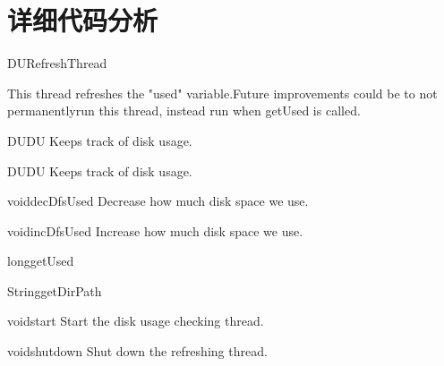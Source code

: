 \chapter{详细代码分析}
\label{ch:src}

\begin{XeClass}{DURefreshThread}

This thread refreshes the "used" variable.Future improvements could be to not permanentlyrun this thread, instead run when getUsed is called.

    \begin{XeMethod}{\XePublic}{DU}{DU}
        Keeps track of disk usage.
    \end{XeMethod}

    \begin{XeMethod}{\XePrivate}{DU}{DU}
        Keeps track of disk usage.
    \end{XeMethod}

    \begin{XeMethod}{\XeProtected}{void}{decDfsUsed}
        Decrease how much disk space we use.
    \end{XeMethod}

    \begin{XeMethod}{\XePublic}{void}{incDfsUsed}
        Increase how much disk space we use.
    \end{XeMethod}

    \begin{XeMethod}{\XePublic}{long}{getUsed}

    \end{XeMethod}

    \begin{XeMethod}{\XePublic}{String}{getDirPath}

    \end{XeMethod}

    \begin{XeMethod}{\XePublic}{void}{start}
        Start the disk usage checking thread.
    \end{XeMethod}

    \begin{XeMethod}{\XePublic}{void}{shutdown}
        Shut down the refreshing thread.
    \end{XeMethod}

\end{XeClass}
